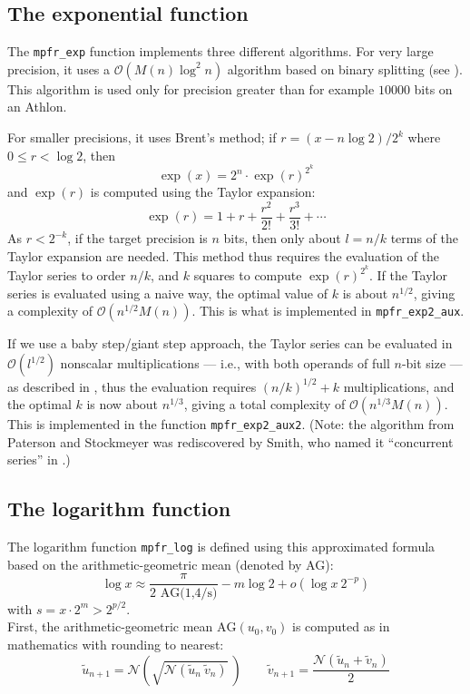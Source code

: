 \documentclass[12pt]{amsart}
\def\O{{\mathcal O}}
\begin{document}
\subsection{The exponential function}

The {\tt mpfr\_exp} function implements three different algorithms.
For very large precision, it uses a $\O(M(n) \log^2 n)$ algorithm
based on binary splitting (see \cite{Jeandel00}).
This algorithm is used only for precision greater
than for example $10000$ bits on an Athlon.

For smaller precisions, it uses Brent's method;
if $r = (x - n \log 2)/2^k$ where $0 \le r < \log 2$, then
\[ \exp(x) = 2^n \cdot \exp(r)^{2^k} \]
and $\exp(r)$ is computed using the Taylor expansion:
\[ \exp(r) =  1 + r + \frac{r^2}{2!} + \frac{r^3}{3!} + \cdots \]
As $r < 2^{-k}$, if the target precision is $n$ bits, then only
about $l = n/k$ terms of the Taylor expansion are needed.
This method thus requires the evaluation of the Taylor series to
order $n/k$, and $k$ squares to compute $\exp(r)^{2^k}$.
If the Taylor series is evaluated using a naive way, the optimal
value of $k$ is about $n^{1/2}$, giving a complexity of $\O(n^{1/2} M(n))$.
This is what is implemented in {\tt mpfr\_exp2\_aux}.

If we use a baby step/giant step approach, the Taylor series
can be evaluated in $\O(l^{1/2})$ nonscalar multiplications 
--- i.e., with both operands of full $n$-bit size --- as described in
\cite{PaSt73},
thus the evaluation requires $(n/k)^{1/2} + k$ multiplications,
and the optimal $k$ is now about $n^{1/3}$,
giving a total complexity of $\O(n^{1/3} M(n))$.
This is implemented in the function {\tt mpfr\_exp2\_aux2}.
(Note: the algorithm from Paterson and Stockmeyer was rediscovered by Smith,
who named it ``concurrent series'' in \cite{Smith91}.)

\subsection{The logarithm function}

The logarithm function \verb!mpfr_log! is defined using this
approximated formula~\cite{Muller97} based on the arithmetic-geometric
mean (denoted by AG):
$$ \log x \approx \frac{\pi}{\mbox{2~AG(1,4/s)}} - m \log 2  + o(\log x ~2^{-p})$$
with $ s = x \cdot 2^m > 2^{p/2}$.\\


First, the arithmetic-geometric mean $\mbox{AG}(u_0,v_0)$ is computed as in
mathematics with rounding to nearest:
$$ {\tilde u_{n+1}} = {\mathcal N} \left( \sqrt{{\mathcal N}({\tilde u_n}~{\tilde v_n})}~\right) \qquad
 {\tilde v_{n+1}} = \frac{{\mathcal N} ({\tilde u_n} + {\tilde v_n})}{2} $$
\end{document}
